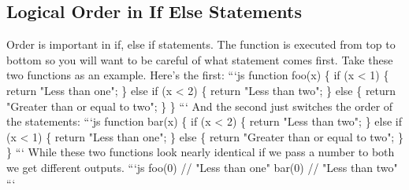 \documentclass{article}%
\begin{document}
\subsection{Logical Order in If Else Statements}%
\label{subsec:LogicalOrderinIfElseStatements}%
Order is important in if, else if statements.\newline%
The function is executed from top to bottom so you will want to be careful of what statement comes first.\newline%
Take these two functions as an example.\newline%
Here's the first:\newline%
```js\newline%
function foo(x) \{\newline%
  if (x < 1) \{\newline%
    return "Less than one";\newline%
  \} else if (x < 2) \{\newline%
    return "Less than two";\newline%
  \} else \{\newline%
    return "Greater than or equal to two";\newline%
  \}\newline%
\}\newline%
```\newline%
And the second just switches the order of the statements:\newline%
```js\newline%
function bar(x) \{\newline%
  if (x < 2) \{\newline%
    return "Less than two";\newline%
  \} else if (x < 1) \{\newline%
    return "Less than one";\newline%
  \} else \{\newline%
    return "Greater than or equal to two";\newline%
  \}\newline%
\}\newline%
```\newline%
While these two functions look nearly identical if we pass a number to both we get different outputs.\newline%
```js\newline%
foo(0) // "Less than one"\newline%
bar(0) // "Less than two"\newline%
```\newline%
\end{document}
